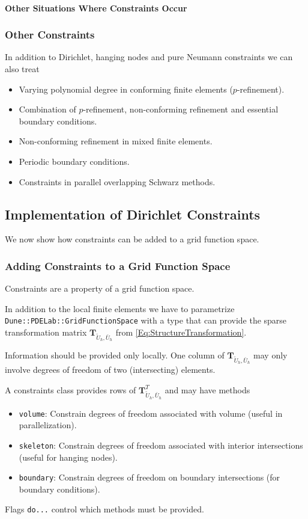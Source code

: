 \paragraph{Other Situations Where Constraints Occur}

\begin{frame}
\frametitle<presentation>{Other Constraints}
In addition to Dirichlet, hanging nodes and pure Neumann constraints we can also treat
\begin{itemize}
\item Varying polynomial degree in conforming finite elements
($p$-refinement).
\item Combination of $p$-refinement, non-conforming refinement and essential
boundary conditions.
\item Non-conforming refinement in mixed finite elements.
\item Periodic boundary conditions.
\item Constraints in parallel overlapping Schwarz methods.
\end{itemize}
\end{frame}


\subsection{Implementation of Dirichlet Constraints}

We now show how constraints can be added to a grid function space.

\begin{frame}
\frametitle<presentation>{Adding Constraints to a Grid Function Space}
Constraints are a property of a grid function space.

In addition to the local finite elements we have to
parametrize \lstinline{Dune::PDELab::GridFunctionSpace} with a type
that can provide the sparse transformation matrix
$\mathbf{T}_{\tilde{U}_h,\bar{U}_h}$ from \eqref{Eq:StructureTransformation}. 

Information should be provided only locally. One
column of $\mathbf{T}_{\tilde{U}_h,\bar{U}_h}$ may only involve
degrees of freedom of two (intersecting) elements.

A constraints class provides rows of
$\mathbf{T}^T_{\tilde{U}_h,\bar{U}_h}$ and may have methods
\begin{itemize}
\item \lstinline{volume}: Constrain degrees of freedom associated with
volume (useful in parallelization).
\item \lstinline{skeleton}: Constrain degrees of freedom associated
with interior intersections (useful for hanging nodes).
\item \lstinline{boundary}: Constrain degrees of freedom on boundary
intersections (for boundary conditions).
\end{itemize}
Flags \lstinline{do...} control which methods must be provided.
\end{frame}

